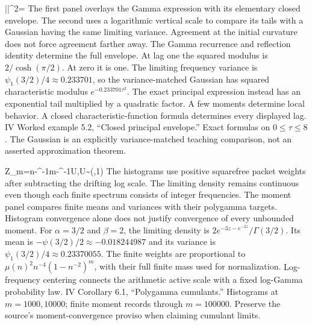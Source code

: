 {\left|\right|^2=}
{The first panel overlays the Gamma expression with its elementary closed envelope. The second uses a logarithmic vertical scale to compare its tails with a Gaussian having the same limiting variance. Agreement at the initial curvature does not force agreement farther away. The Gamma recurrence and reflection identity determine the full envelope.}
{At lag one the squared modulus is $2/\cosh(\pi/2)$. At zero it is one. The limiting frequency variance is $\psi_1(3/2)/4\approx0.233701$, so the variance-matched Gaussian has squared characteristic modulus $e^{-0.233701\tau^2}$. The exact principal expression instead has an exponential tail multiplied by a quadratic factor.}
{A few moments determine local behavior. A closed characteristic-function formula determines every displayed lag.}
{IV Worked example 5.2, ``Closed principal envelope.'' Exact formulas on $0\le\tau\le8$. The Gaussian is an explicitly variance-matched teaching comparison, not an asserted approximation theorem.}

{Z_m=\log n-\beta^{-1}\log m\Longrightarrow-\beta^{-1}\log U,\qquad U\sim{}(\alpha,1)}
{The histograms use positive squarefree packet weights after subtracting the drifting log scale. The limiting density remains continuous even though each finite spectrum consists of integer frequencies. The moment panel compares finite means and variances with their polygamma targets. Histogram convergence alone does not justify convergence of every unbounded moment.}
{For $\alpha=3/2$ and $\beta=2$, the limiting density is $2e^{-3z-e^{-2z}}/\Gamma(3/2)$. Its mean is $-\psi(3/2)/2\approx-0.018244987$ and its variance is $\psi_1(3/2)/4\approx0.23370055$. The finite weights are proportional to $\mu(n)^2n^{-4}(1-n^{-2})^m$, with their full finite mass used for normalization.}
{Log-frequency centering connects the arithmetic active scale with a fixed log-Gamma probability law.}
{IV Corollary 6.1, ``Polygamma cumulants.'' Histograms at $m=1000,10000$; finite moment records through $m=100000$. Preserve the source's moment-convergence proviso when claiming cumulant limits.}

